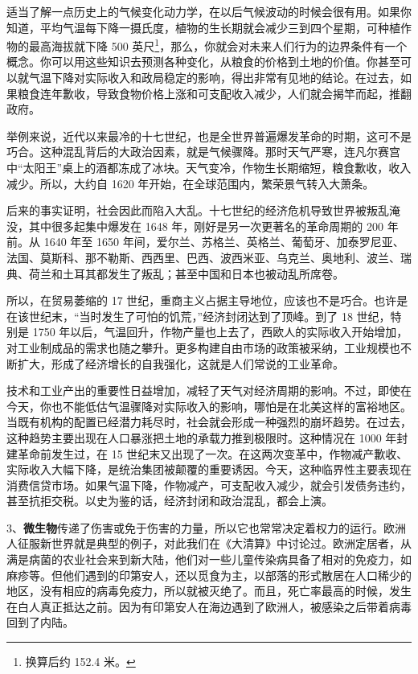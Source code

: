 适当了解一点历史上的气候变化动力学，在以后气候波动的时候会很有用。如果你知道，平均气温每下降一摄氏度，植物的生长期就会减少三到四个星期，可种植作物的最高海拔就下降 500 英尺\footnote{换算后约 152.4 米。}，那么，你就会对未来人们行为的边界条件有一个概念。你可以用这些知识去预测各种变化，从粮食的价格到土地的价值。你甚至可以就气温下降对实际收入和政局稳定的影响，得出非常有见地的结论。在过去，如果粮食连年歉收，导致食物价格上涨和可支配收入减少，人们就会揭竿而起，推翻政府。

举例来说，近代以来最冷的十七世纪，也是全世界普遍爆发革命的时期，这可不是巧合。这种混乱背后的大政治因素，就是气候骤降。那时天气严寒，连凡尔赛宫中“太阳王”桌上的酒都冻成了冰块。天气变冷，作物生长期缩短，粮食歉收，收入减少。所以，大约自 1620 年开始，在全球范围内，繁荣景气转入大萧条。

后来的事实证明，社会因此而陷入大乱。十七世纪的经济危机导致世界被叛乱淹没，其中很多起集中爆发在 1648 年，刚好是另一次更著名的革命周期的 200 年前。从 1640 年至 1650 年间，爱尔兰、苏格兰、英格兰、葡萄牙、加泰罗尼亚、法国、莫斯科、那不勒斯、西西里、巴西、波西米亚、乌克兰、奥地利、波兰、瑞典、荷兰和土耳其都发生了叛乱；甚至中国和日本也被动乱所席卷。

所以，在贸易萎缩的 17 世纪，重商主义占据主导地位，应该也不是巧合。也许是在该世纪末，“当时发生了可怕的饥荒，”经济封闭达到了顶峰。到了 18 世纪，特别是 1750 年以后，气温回升，作物产量也上去了，西欧人的实际收入开始增加，对工业制成品的需求也随之攀升。更多构建自由市场的政策被采纳，工业规模也不断扩大，形成了经济增长的自我强化，这就是人们常说的工业革命。

技术和工业产出的重要性日益增加，减轻了天气对经济周期的影响。不过，即使在今天，你也不能低估气温骤降对实际收入的影响，哪怕是在北美这样的富裕地区。当既有机构的配置已经潜力耗尽时，社会就会形成一种强烈的崩坏趋势。在过去，这种趋势主要出现在人口暴涨把土地的承载力推到极限时。这种情况在 1000 年封建革命前发生过，在 15 世纪末又出现了一次。在这两次变革中，作物减产歉收、实际收入大幅下降，是统治集团被颠覆的重要诱因。今天，这种临界性主要表现在消费信贷市场。如果气温下降，作物减产，可支配收入减少，就会引发债务违约，甚至抗拒交税。以史为鉴的话，经济封闭和政治混乱，都会上演。

3、\textbf{微生物}传递了伤害或免于伤害的力量，所以它也常常决定着权力的运行。欧洲人征服新世界就是典型的例子，对此我们在《大清算》中讨论过。欧洲定居者，从满是病菌的农业社会来到新大陆，他们对一些儿童传染病具备了相对的免疫力，如麻疹等。但他们遇到的印第安人，还以觅食为主，以部落的形式散居在人口稀少的地区，没有相应的病毒免疫力，所以就被灭绝了。而且，死亡率最高的时候，发生在白人真正抵达之前。因为有印第安人在海边遇到了欧洲人，被感染之后带着病毒回到了内陆。

